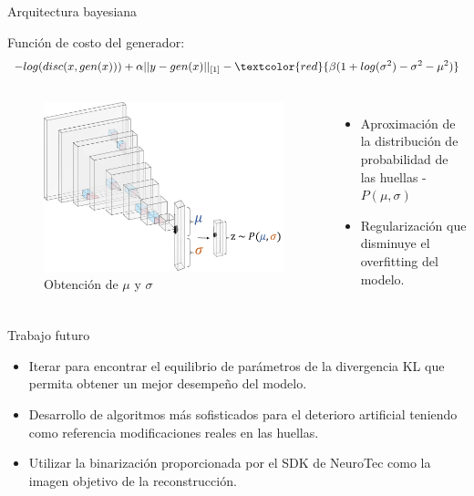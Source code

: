 \documentclass[12pt,aspectratio=169]{beamer}
\begin{document}
\begin{frame}{Arquitectura bayesiana}

    Función de costo del generador:
    \begin{equation}
        - log(disc(x,gen(x)))+\alpha||y-gen(x)||_{[1]}-\textcolor{red}{\beta(1+log(\sigma^{2})-\sigma^{2}-\mu^{2})}
    \end{equation}
    
    \begin{columns}[c] 
            \begin{figure}
                \includegraphics[scale=0.26]{figs/latent_vector.png}
                \caption{Obtención de $\mu$ y $\sigma$}
            \end{figure}
            \begin{itemize}
                \item Aproximación de la distribución de probabilidad de las huellas - $P(\mu,\sigma)$
                \vspace{10mm}
                \item Regularización que disminuye el overfitting del modelo.
            \end{itemize}
    \end{columns}
    
\end{frame}

\begin{frame}{Trabajo futuro}

    \begin{itemize}
        \setlength\itemsep{5mm}
        \item Iterar para encontrar el equilibrio de parámetros de la divergencia KL que permita obtener un mejor desempeño del modelo.
        \item Desarrollo de algoritmos más sofisticados para el deterioro artificial teniendo como referencia modificaciones reales en las huellas.
        \item Utilizar la binarización proporcionada por el SDK de NeuroTec como la imagen objetivo de la reconstrucción.
    \end{itemize}

\end{frame}
\end{document}

